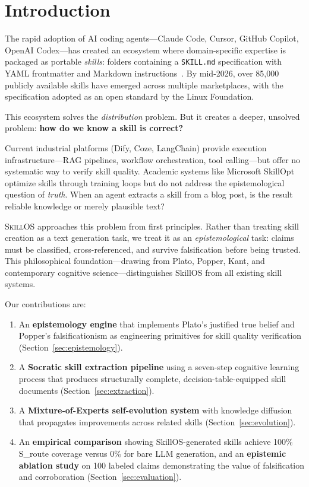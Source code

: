 \documentclass[11pt]{article}
\begin{document}
\section{Introduction}

The rapid adoption of AI coding agents---Claude Code, Cursor, GitHub Copilot, OpenAI Codex---has created an ecosystem where domain-specific expertise is packaged as portable \textit{skills}: folders containing a \texttt{SKILL.md} specification with YAML frontmatter and Markdown instructions~\cite{agentskills}. By mid-2026, over 85,000 publicly available skills have emerged across multiple marketplaces, with the specification adopted as an open standard by the Linux Foundation.

This ecosystem solves the \textit{distribution} problem. But it creates a deeper, unsolved problem: \textbf{how do we know a skill is correct?}

Current industrial platforms (Dify, Coze, LangChain) provide execution infrastructure---RAG pipelines, workflow orchestration, tool calling---but offer no systematic way to verify skill quality. Academic systems like Microsoft SkillOpt~\cite{skillopt} optimize skills through training loops but do not address the epistemological question of \textit{truth}. When an agent extracts a skill from a blog post, is the result reliable knowledge or merely plausible text?

\textsc{SkillOS} approaches this problem from first principles. Rather than treating skill creation as a text generation task, we treat it as an \textit{epistemological} task: claims must be classified, cross-referenced, and survive falsification before being trusted. This philosophical foundation---drawing from Plato, Popper, Kant, and contemporary cognitive science---distinguishes SkillOS from all existing skill systems.

Our contributions are:
\begin{enumerate}[leftmargin=*,nosep]
    \item An \textbf{epistemology engine} that implements Plato's justified true belief and Popper's falsificationism as engineering primitives for skill quality verification (Section~\ref{sec:epistemology}).
    \item A \textbf{Socratic skill extraction pipeline} using a seven-step cognitive learning process that produces structurally complete, decision-table-equipped skill documents (Section~\ref{sec:extraction}).
    \item A \textbf{Mixture-of-Experts self-evolution system} with knowledge diffusion that propagates improvements across related skills (Section~\ref{sec:evolution}).
    \item An \textbf{empirical comparison} showing SkillOS-generated skills achieve 100\% S\_route coverage versus 0\% for bare LLM generation, and an \textbf{epistemic ablation study} on 100 labeled claims demonstrating the value of falsification and corroboration (Section~\ref{sec:evaluation}).
\end{enumerate}
\end{document}
